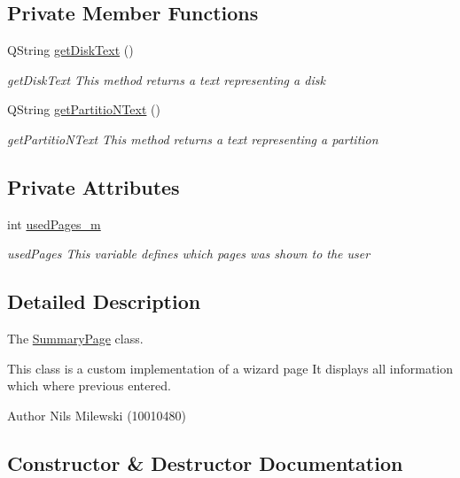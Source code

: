 \subsection*{Private Member Functions}
\begin{DoxyCompactItemize}
\item 
Q\+String \mbox{\hyperlink{class_summary_page_af31d12dc5ed2c917c8f65fe7790b661f}{get\+Disk\+Text}} ()
\begin{DoxyCompactList}\small\item\em get\+Disk\+Text This method returns a text representing a disk \end{DoxyCompactList}\item 
Q\+String \mbox{\hyperlink{class_summary_page_a0100c8e2a029708c5447c20c83bd7257}{get\+Partitio\+N\+Text}} ()
\begin{DoxyCompactList}\small\item\em get\+Partitio\+N\+Text This method returns a text representing a partition \end{DoxyCompactList}\end{DoxyCompactItemize}
\subsection*{Private Attributes}
\begin{DoxyCompactItemize}
\item 
int \mbox{\hyperlink{class_summary_page_ac83b1145df468cfd64b81655e2bf7488}{used\+Pages\+\_\+m}}
\begin{DoxyCompactList}\small\item\em used\+Pages This variable defines which pages was shown to the user \end{DoxyCompactList}\end{DoxyCompactItemize}


\subsection{Detailed Description}
The \mbox{\hyperlink{class_summary_page}{Summary\+Page}} class. 

This class is a custom implementation of a wizard page It displays all information which where previous entered. \begin{DoxyAuthor}{Author}
Nils Milewski (10010480) 
\end{DoxyAuthor}


\subsection{Constructor \& Destructor Documentation}
\mbox{\label{class_summary_page_a798aff071dddd63b2b5ee049fa87e6a7}} 
